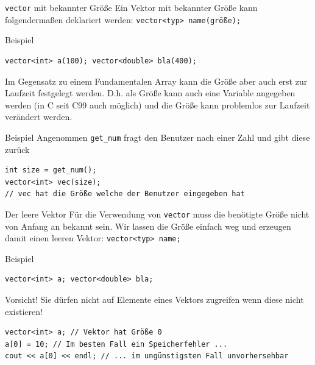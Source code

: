 \documentclass[presentation]{beamer}
\begin{document}
\begin{frame}[fragile,label={sec:org130eca2}]{{\color{solarizedYellow}\texttt{vector} }mit bekannter Größe}
 Ein Vektor mit bekannter Größe kann folgendermaßen deklariert werden: {\color{solarizedYellow}\texttt{vector<typ> name(größe);}}
\begin{exampleblock}{Beispiel}
\begin{verbatim}
vector<int> a(100); vector<double> bla(400);
\end{verbatim}
\end{exampleblock}
Im Gegensatz zu einem Fundamentalen Array kann die Größe aber auch
erst \alert{zur Laufzeit} festgelegt werden. D.h. \alert{als Größe kann auch eine
Variable} angegeben werden (in C seit C99 auch möglich) und die
\alert{Größe} kann problemlos \alert{zur Laufzeit verändert werden}.
\begin{exampleblock}{Beispiel}
Angenommen {\color{solarizedYellow}\texttt{get\_num} }fragt den Benutzer nach einer Zahl und gibt
diese zurück
\begin{verbatim}
int size = get_num();
vector<int> vec(size);
// vec hat die Größe welche der Benutzer eingegeben hat
\end{verbatim}
\end{exampleblock}
\end{frame}
\begin{frame}[fragile,label={sec:orgeec5c98}]{Der leere Vektor}
 Für die Verwendung von {\color{solarizedYellow}\texttt{vector} }muss die benötigte \alert{Größe nicht von
Anfang an bekannt sein}. Wir lassen die Größe einfach weg und erzeugen
damit einen leeren Vektor: {\color{solarizedYellow}\texttt{vector<typ> name;}}
\begin{exampleblock}{Beispiel}
\begin{verbatim}
vector<int> a; vector<double> bla;
\end{verbatim}
\end{exampleblock}
\begin{alertblock}{Vorsicht!}
Sie dürfen nicht auf Elemente eines Vektors zugreifen wenn diese nicht
existieren!
\begin{verbatim}
vector<int> a; // Vektor hat Größe 0
a[0] = 10; // Im besten Fall ein Speicherfehler ...
cout << a[0] << endl; // ... im ungünstigsten Fall unvorhersehbar
\end{verbatim}
\end{alertblock}
\end{frame}
\end{document}
